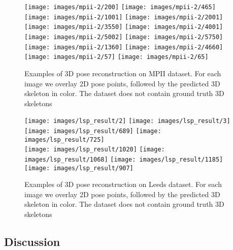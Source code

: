 \documentclass[runningheads]{llncs}
\begin{document}
\begin{figure}[htb!]
	\texttt{[image: images/mpii-2/200]}
	\texttt{[image: images/mpii-2/465]}	
	\texttt{[image: images/mpii-2/1001]}
	\texttt{[image: images/mpii-2/2001]}\\
	
	\texttt{[image: images/mpii-2/3550]}
	\texttt{[image: images/mpii-2/4001]}	
	\texttt{[image: images/mpii-2/5002]}
	\texttt{[image: images/mpii-2/5750]}\\
	
	\texttt{[image: images/mpii-2/1360]}
	\texttt{[image: images/mpii-2/4660]}	
	\texttt{[image: images/mpii-2/57]}
	\texttt{[image: images/mpii-2/65]}
	\\
	\caption{Examples of 3D pose reconstruction on MPII dataset. For each image we overlay 2D pose points, followed by the predicted 3D skeleton in color. The dataset does not contain ground truth 3D skeletons}
	\label{fig:mpii}
\end{figure}\begin{figure}[htb!]
	\centering
	\texttt{[image: images/lsp\_result/2]}
	\texttt{[image: images/lsp\_result/3]}
	\texttt{[image: images/lsp\_result/689]}
	\texttt{[image: images/lsp\_result/725]}\\
	
	\texttt{[image: images/lsp\_result/1020]}
	\texttt{[image: images/lsp\_result/1068]}
	\texttt{[image: images/lsp\_result/1185]}
	\texttt{[image: images/lsp\_result/907]}
			
	\caption{Examples of 3D pose reconstruction on Leeds dataset. For each image we overlay 2D pose points, followed by the predicted 3D skeleton in color. The dataset does not contain ground truth 3D skeletons}
	\label{fig:leeds}
\end{figure}\subsection{Discussion}\label{subsect:discussions}
\end{document}
